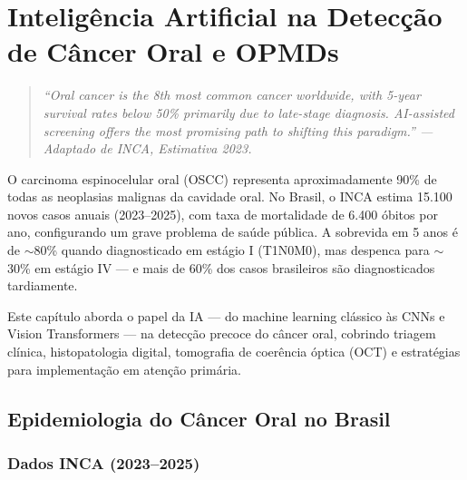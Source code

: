 
\chapter{Inteligência Artificial na Detecção de Câncer Oral e OPMDs}
\label{cap:cancer-oral}

\nivelquatro

\begin{quote}
\itshape\small
``Oral cancer is the 8th most common cancer worldwide, with 5-year survival rates
below 50\% primarily due to late-stage diagnosis. AI-assisted screening offers the
most promising path to shifting this paradigm.'' --- Adaptado de INCA, Estimativa 2023.
\end{quote}

O carcinoma espinocelular oral (OSCC) representa aproximadamente 90\% de todas as
neoplasias malignas da cavidade oral. No Brasil, o INCA estima 15.100 novos casos
anuais (2023--2025), com taxa de mortalidade de 6.400 óbitos por ano, configurando
um grave problema de saúde pública. A sobrevida em 5 anos é de $\sim$80\% quando
diagnosticado em estágio I (T1N0M0), mas despenca para $\sim$30\% em estágio IV
--- e mais de 60\% dos casos brasileiros são diagnosticados tardiamente.

Este capítulo aborda o papel da IA --- do machine learning clássico às CNNs e
Vision Transformers --- na detecção precoce do câncer oral, cobrindo triagem
clínica, histopatologia digital, tomografia de coerência óptica (OCT) e estratégias
para implementação em atenção primária.


\section{Epidemiologia do Câncer Oral no Brasil}
\label{sec:epidemiologia}

\subsection{Dados INCA (2023--2025)}

